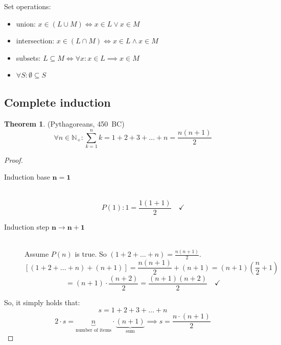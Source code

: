 \documentclass[a4paper,landscape,twocolumn]{article}
\theoremstyle{definition}
\newtheorem{theorem}{Theorem}
\begin{document}
Set operations:
\begin{itemize}
  \item union: $x \in (L \cup M) \iff x \in L \lor x \in M$
  \item intersection: $x \in (L \cap M) \iff x \in L \land x \in M$
  \item subsets: $L \subseteq M \iff \forall x: x \in L \implies x \in M$
  \item $\forall S: \emptyset \subseteq S$
\end{itemize}

\subsection{Complete induction}

\begin{theorem} (Pythagoreans, 450~BC)
  \[ \forall n \in \mathbb N_+: \sum_{k=1}^n k = 1 + 2 + 3 + \dots + n = \frac{n (n+1)}{2} \]
\end{theorem}
\begin{proof}
  \begin{description}
    \item[Induction base $\mathbf{n = 1}$] \hfill{} \\
      \[ P(1): 1 = \frac{1 (1+1)}{2} \quad\checkmark \]
    \item[Induction step $\mathbf{n \to n + 1}$] \hfill{} \\
      Assume $P(n)$ is true.
      So $(1 + 2 + \dots + n) = \frac{n (n+1)}{2}$.
      \[ \left[(1 + 2 + \dots + n) + (n + 1)\right] = \frac{n(n+1)}{2} + (n+1) = (n+1) \left(\frac n2 + 1\right) \]
      \[ = (n+1) \cdot \frac{(n+2)}{2} = \frac{(n+1)(n+2)}{2} \quad\checkmark \]
  \end{description}

  So, it simply holds that:
  \[ s = 1 + 2 + 3 + \dots + n \]
  \[ 2 \cdot s = \underbrace{n}_{\text{number of items}} \cdot \underbrace{(n + 1)}_{\text{sum}} \implies s = \frac{n \cdot (n + 1)}{2} \]
\end{proof}
\end{document}

